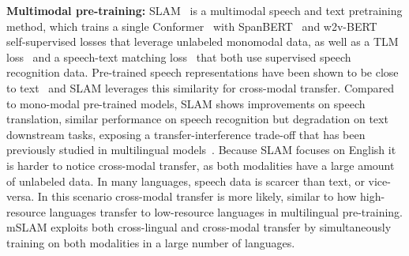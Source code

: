\documentclass[nohyperref]{article}
\newcommand{\mslam}{mSLAM}
\begin{document}
\textbf{Multimodal pre-training:}
SLAM~\cite{bapna2021slam} is a multimodal speech and text pretraining method, which trains a single Conformer~\cite{gulati2020conformer} with SpanBERT~\citep{Joshi2020SpanBERTIP} and w2v-BERT~\citep{chung2021w2v} self-supervised losses that leverage unlabeled monomodal data, as well as a TLM loss~\cite{conneau2019cross,zheng2021fused} and a speech-text matching loss~\citep{li2021align} that both use supervised speech recognition data. Pre-trained speech representations have been shown to be close to text~\cite{baevski2021unsupervised} and SLAM leverages this similarity for cross-modal transfer. Compared to mono-modal pre-trained models, SLAM shows improvements on speech translation, similar performance on speech recognition but degradation on text downstream tasks, exposing a transfer-interference trade-off that has been previously studied in multilingual models~\cite{arivazhagan2019massively}. Because SLAM focuses on English it is harder to notice cross-modal transfer, as both modalities have a large amount of unlabeled data. In many languages, speech data is scarcer than text, or vice-versa. In this scenario cross-modal transfer is more likely, similar to how high-resource languages transfer to low-resource languages in multilingual pre-training. \mslam{} exploits both cross-lingual and cross-modal transfer by simultaneously training on both modalities in a large number of languages.
\end{document}

